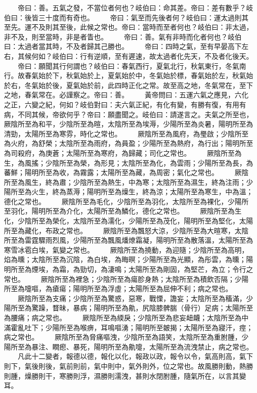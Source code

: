 　　帝曰：善。五氣之發，不當位者何也？岐伯曰：命其差。帝曰：差有數乎？岐伯曰：後皆三十度而有奇也。
　　帝曰：氣至而先後者何？岐伯曰：運太過則其至先。運不及則其至後，此候之常也。帝曰：當時而至者何也？岐伯曰：非太過，非不及，則至當時，非是者眚也。
　　帝曰：善。氣有非時而化者何也？岐伯曰：太過者當其時，不及者歸其己勝也。
　　帝曰：四時之氣，至有早晏高下左右，其候何如？岐伯曰：行有逆順，至有遲速，故太過者化先天，不及者化後天。
　　帝曰：願聞其行何謂也？岐伯曰：春氣西行，夏氣北行，秋氣東行，冬氣南行。故春氣始於下，秋氣始於上，夏氣始於中，冬氣始於標，春氣始於左，秋氣始於右，冬氣始於後，夏氣始於前，此四時正化之常。故至高之地，冬氣常在，至下之地，春氣常在。必謹察之。帝曰：善。
　　黃帝問曰：五運六氣之應見，六化之正，六變之紀，何如？岐伯對曰：夫六氣正紀，有化有變，有勝有復，有用有病，不同其候，帝欲何乎？帝曰：願盡聞之。岐伯曰：請遂言之。夫氣之所至也，厥陰所至為和平，少陰所至為暄，太陰所至為埃溽，少陽所至為炎暑，陽明所至為清勁，太陽所至為寒雰，時化之常也。
　　厥陰所至為風府，為璺啟；少陰所至為火府，為舒榮；太陰所至為雨府，為員盈；少陽所至為熱府，為行出；陽明所至為司殺府，為庚蒼；太陽所至為寒府，為歸藏；司化之常也。
　　厥陰所至為生，為風搖；少陰所至為榮，為形見；太陰所至為化，為雲雨；少陽所至為長，為蕃鮮；陽明所至為收，為霧露；太陽所至為藏，為周密；氣化之常也。
　　厥陰所至為風生，終為肅；少陰所至為熱生，中為寒；太陰所至為濕生，終為注雨；少陽所至為火生，終為蒸溽；陽明所至為燥生，終為涼；太陽所至為寒生，中為溫；德化之常也。
　　厥陰所至為毛化，少陰所至為羽化，太陰所至為裸化，少陽所至羽化，陽明所至為介化，太陽所至為鱗化，德化之常也。
　　厥陰所至為生化，少陰所至為榮化，太陰所至為濡化，少陽所至為茂化，陽明所至為堅化，太陽所至為藏化，布政之常也。
　　厥陰所至為飄怒大涼，少陰所至為大暄寒，太陰所至為雷霆驟雨烈風，少陽所至為飄風燔燎霜凝，陽明所至為散落溫，太陽所至為寒雪冰雹白埃，氣變之常也。
　　厥陰所至為撓動，為迎隨；少陰所至為高明，焰為曛；太陰所至為沉陰，為白埃，為晦暝；少陽所至為光顯，為彤雲，為曛；陽明所至為煙埃，為霜，為勁切，為淒鳴；太陽所至為剛固，為堅芒，為立；令行之常也。
　　厥陰所至為裡急；少陰所至為瘍胗身熱；太陰所至為積飲否隔；少陽所至為嚏嘔，為瘡瘍；陽明所至為浮虛；太陽所至為屈伸不利；病之常也。
　　厥陰所至為支痛；少陰所至為驚惑，惡寒，戰慄，譫妄；太陰所至為稸滿，少陽所至為驚躁，瞀昧，暴病；陽明所至為鼽，尻陰膝髀腨（骨行）足病；太陽所至為腰痛；病之常也。
　　厥陰所至為緛戾；少陰所至為悲妄衄衊；太陰所至為中滿霍亂吐下；少陽所至為喉痹，耳鳴嘔湧；陽明所至皴揭；太陽所至為寢汗，痙；病之常也。
　　厥陰所至為脅痛嘔洩，少陰所至為語笑，太陰所至為重胕腫，少陽所至為暴注、瞤瘛、暴死，陽明所至為鼽嚏，太陽所至為流洩禁止，病之常也。
　　凡此十二變者，報德以德，報化以化，報政以政，報令以令，氣高則高，氣下則下，氣後則後，氣前則前，氣中則中，氣外則外，位之常也。故風勝則動，熱勝則腫，燥勝則干，寒勝則浮，濕勝則濡洩，甚則水閉胕腫，隨氣所在，以言其變耳。
